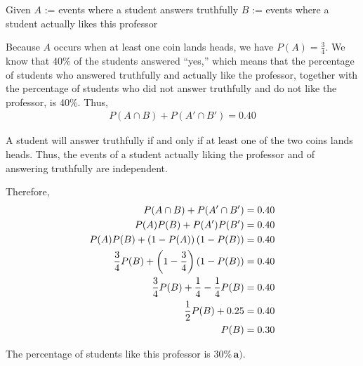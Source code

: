 \documentclass[a4paper, 10pt]{article}
\begin{document}
\begin{tosubmit}
	Given \newline
	\( A \) := events where a student answers truthfully \newline
	\( B \) := events where a student actually likes this professor

	\myspace

	\par\noindent Because \( A \) occurs when at least one coin lands heads, we have \( P(A)=\frac{3}{4} \).
	We know that 40\% of the students answered ``yes,'' which means that the percentage of students
	who answered truthfully and actually like the professor,
	together with the percentage of students who did not answer truthfully and do not like the professor, is 40\%. Thus,
	\begin{align*}
		P(A \cap B) + P(A' \cap B')=0.40
	\end{align*}

	\par\noindent A student will answer truthfully if and only if at least one of the two coins lands heads. \newline
	Thus, the events of a student actually liking the professor and of answering truthfully are independent.

	\myspace

	\par\noindent Therefore,
	\begin{align*}
		P(A \cap B)+P(A' \cap B')                             & = 0.40 \\
		P(A)P(B)+P(A')P(B')                                   & = 0.40 \\
		P(A)P(B)+\left(1-P(A)\right)\left(1-P(B)\right)                 & = 0.40 \\
		\frac{3}{4}P(B) + \left(1-\frac{3}{4}\right)\left(1-P(B)\right) & = 0.40 \\
		\frac{3}{4}P(B)+\frac{1}{4}-\frac{1}{4}P(B)           & = 0.40 \\
		\frac{1}{2}P(B)+0.25                                  & = 0.40 \\
		P(B)                                                  & = 0.30
	\end{align*}

	The percentage of students like this professor is \( \boxed{30\%} \, \textbf{a).} \)

	\myspace


\end{tosubmit}
\end{document}
